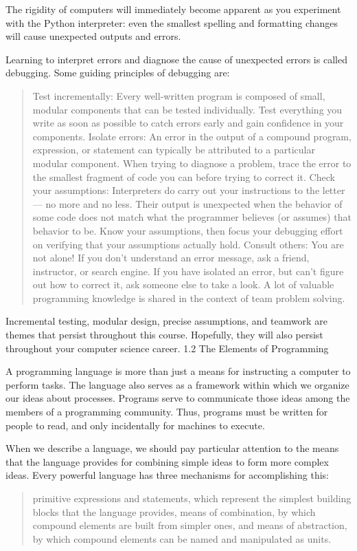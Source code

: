 \documentclass[letterpaper,10pt,dvipdfmx]{sphinxmanual}
\begin{document}
The rigidity of computers will immediately become apparent as you experiment with the Python interpreter: even the smallest spelling and formatting changes will cause unexpected outputs and errors.

Learning to interpret errors and diagnose the cause of unexpected errors is called debugging. Some guiding principles of debugging are:
\begin{quote}

Test incrementally: Every well-written program is composed of small, modular components that can be tested individually. Test everything you write as soon as possible to catch errors early and gain confidence in your components.
Isolate errors: An error in the output of a compound program, expression, or statement can typically be attributed to a particular modular component. When trying to diagnose a problem, trace the error to the smallest fragment of code you can before trying to correct it.
Check your assumptions: Interpreters do carry out your instructions to the letter --- no more and no less. Their output is unexpected when the behavior of some code does not match what the programmer believes (or assumes) that behavior to be. Know your assumptions, then focus your debugging effort on verifying that your assumptions actually hold.
Consult others: You are not alone! If you don't understand an error message, ask a friend, instructor, or search engine. If you have isolated an error, but can't figure out how to correct it, ask someone else to take a look. A lot of valuable programming knowledge is shared in the context of team problem solving.
\end{quote}

Incremental testing, modular design, precise assumptions, and teamwork are themes that persist throughout this course. Hopefully, they will also persist throughout your computer science career.
1.2   The Elements of Programming

A programming language is more than just a means for instructing a computer to perform tasks. The language also serves as a framework within which we organize our ideas about processes. Programs serve to communicate those ideas among the members of a programming community. Thus, programs must be written for people to read, and only incidentally for machines to execute.

When we describe a language, we should pay particular attention to the means that the language provides for combining simple ideas to form more complex ideas. Every powerful language has three mechanisms for accomplishing this:
\begin{quote}

primitive expressions and statements, which represent the simplest building blocks that the language provides,
means of combination, by which compound elements are built from simpler ones, and
means of abstraction, by which compound elements can be named and manipulated as units.
\end{quote}
\end{document}
